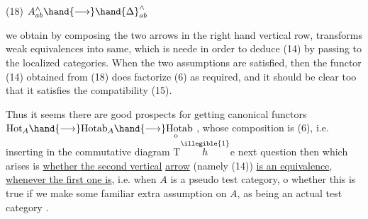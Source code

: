 
(18) \qquad $A^{\wedge}_{ab} \hand{\longrightarrow} \hand{\Delta}^{\wedge}_{ab}$

we obtain by composing the two arrows in the right hand vertical row,
transforms weak equivalences into same, which is neede in order to
deduce  (14) by passing to the localized categories. When the two
assumptions are satisfied, then the functor (14) obtained from (18)
does factorize (6) as required, and it should be clear too that it
satisfies the compatibility (15).

Thus it seems there are good prospects for getting canonical
functors\newline
{} \qquad $\mathrm{Hot}_{A} \hand{\longrightarrow} \mathrm{Hotab}_{A} \hand{\longrightarrow} \mathrm{H}\underset{\mathrm{o}}{\mathrm{o}}\mathrm{tab}$ \quad ,
whose composition is (6), i.e. inserting in the commutative diagram
T$\overset{\illegible{1}}{h}$e next question then which arises is \uline{whether the second vertical}
\uline{arrow} (namely (14)) \uline{is an equivalence}, \uline{whenever the first one is}, i.e.
when $A$ is a pseudo test category, o whether this is true if we make
some familiar extra assumption on $A$,  as being an actual test category .

